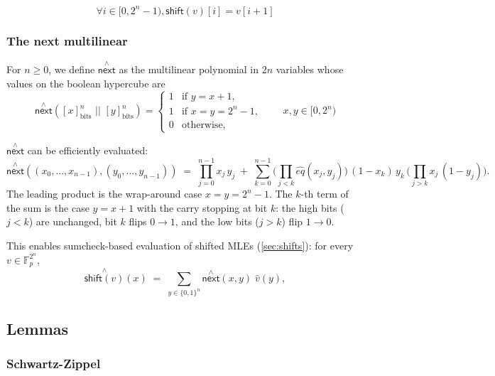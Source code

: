 \documentclass{article}
\theoremstyle{definition}
\newcommand{\Fp}{\mathbb F_p}
\newcommand{\nextmle}{\overset{\scriptscriptstyle\wedge}{\textsf{next}}}
\begin{document}
$$
\forall i \in [0, 2^n - 1), \mathsf{shift}(v)[i] = v[i + 1]
$$

\subsubsection{The next multilinear}\label{sec:next-mle}

For $n \geq 0$, we define $\nextmle$ as the multilinear polynomial in $2n$ variables whose values on the boolean hypercube are
\[
\nextmle([x]_\text{bits}^n \,\, || \,\, [y]_\text{bits}^n) =
\begin{cases}
1 & \text{if } y = x + 1, \\
1 & \text{if } x = y = 2^n - 1, \\
0 & \text{otherwise},
\end{cases}
\qquad x, y \in [0, 2^n)
\]

$\nextmle$ can be efficiently evaluated:
\[
\nextmle((x_0, \ldots, x_{n-1}), (y_0, \ldots, y_{n-1})) \;=\; \prod_{j=0}^{n-1} x_j\, y_j \;+\; \sum_{k=0}^{n-1} \Bigg( \prod_{j<k} \hat{eq}(x_j, y_j) \Bigg)\, (1 - x_k)\, y_k \, \Bigg( \prod_{j>k} x_j\, (1 - y_j) \Bigg) .
\]
The leading product is the wrap-around case $x = y = 2^n - 1$. The $k$-th term of the sum is the case $y = x + 1$ with the carry stopping at bit $k$: the high bits ($j < k$) are unchanged, bit $k$ flips $0 \to 1$, and the low bits ($j > k$) flip $1 \to 0$.

This enables sumcheck-based evaluation of shifted MLEs (\cref{sec:shifts}): for every $v \in \Fp^{2^n}$,
\[
\overset{\scriptscriptstyle\wedge}{\textsf{shift}(v)}(x) \;=\; \sum_{y \in \{0,1\}^n} \nextmle(x, y)\; \hat{v}(y) ,
\]

\subsection{Lemmas}

\subsubsection{Schwartz-Zippel}
\end{document}
